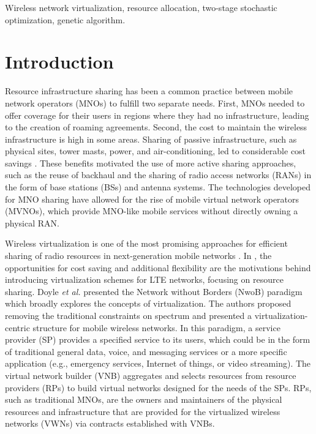 \documentclass[conference]{IEEEtran}
\begin{document}
\begin{IEEEkeywords}
Wireless network virtualization, resource allocation, two-stage stochastic optimization, genetic algorithm.
\end{IEEEkeywords}




%
\IEEEpeerreviewmaketitle



\section{Introduction} \label{sec:intro}
Resource infrastructure sharing has been a common practice between mobile network operators (MNOs) to fulfill two separate needs.  First, MNOs needed to offer coverage for their users in regions where they had no infrastructure, leading to the creation of roaming agreements.  Second, the cost to maintain the wireless infrastructure is high in some areas.  Sharing of passive infrastructure, such as physical sites, tower masts, power, and air-conditioning, led to considerable cost savings \cite{1421931}.  These benefits motivated the use of more active sharing approaches, such as the reuse of backhaul and the sharing of radio access networks (RANs) in the form of base stations (BSs) and antenna systems.  The technologies developed for MNO sharing have allowed for the rise of mobile virtual network operators (MVNOs), which provide MNO-like mobile services without directly owning a physical RAN.

Wireless virtualization is one of the most promising approaches for efficient sharing of radio resources in next-generation mobile networks \cite{6824752}.  In \cite{6553675, 6571315}, the opportunities for cost saving and additional flexibility are the motivations behind introducing virtualization schemes for LTE networks, focusing on resource sharing.  Doyle \textit{et al.} \cite{6737248} presented the Network without Borders (NwoB) paradigm which broadly explores the concepts of virtualization.  The authors proposed removing the traditional constraints on spectrum and presented a virtualization-centric structure for mobile wireless networks.  In this paradigm, a service provider (SP) provides a specified service to its users, which could be in the form of traditional general data, voice, and messaging services or a more specific application (e.g., emergency services, Internet of things, or video streaming).  The virtual network builder (VNB) aggregates and selects resources from resource providers (RPs) to build virtual networks designed for the needs of the SPs.  RPs, such as traditional MNOs, are the owners and maintainers of the physical resources and infrastructure that are provided for the virtualized wireless networks (VWNs) via contracts established with VNBs.
\end{document}

